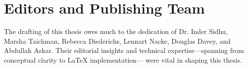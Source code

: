 \section*{Editors and Publishing Team}
The drafting of this thesis owes much to the dedication of Dr. Inder Sidhu, Marsha Taichman, Rebecca Diederichs, Lennart Nacke, Douglas Davey, and Abdullah Askar. Their editorial insights and technical expertise—spanning from conceptual clarity to LaTeX implementation— were vital in shaping this thesis.